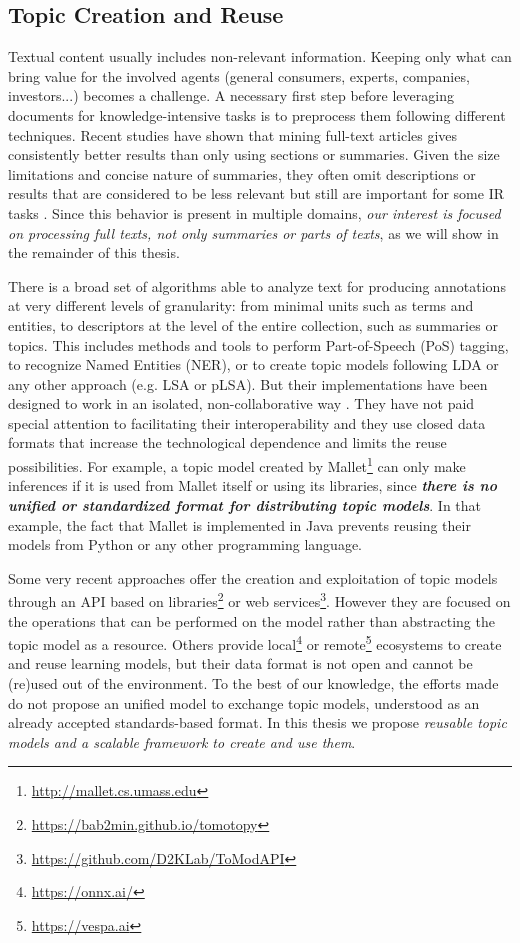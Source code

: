 \subsection{Topic Creation and Reuse}
\label{sec:topic-reuse}

Textual content usually includes non-relevant information. Keeping only what can bring value for the involved agents (general consumers, experts, companies, investors...) becomes a challenge. A necessary first step before leveraging documents for knowledge-intensive tasks is to preprocess them following different techniques. Recent studies \citep{Westergaard2017} have shown that mining full-text articles gives consistently better results than only using sections or summaries. Given the size limitations and concise nature of summaries, they often omit descriptions or results that are considered to be less relevant but still are important for some IR tasks \citep{Divoli2012}.  Since this behavior is present in multiple domains, \textit{our interest is focused on processing full texts, not only summaries or parts of texts}, as we will show in the remainder of this thesis.

There is a broad set of algorithms able to analyze text for producing annotations at very different levels of granularity: from minimal units such as terms and entities, to descriptors at the level of the entire collection, such as summaries or topics. This includes methods and tools to perform Part-of-Speech (PoS) tagging, to recognize Named Entities (NER), or to create topic models following LDA or any other approach (e.g. LSA or pLSA). But their implementations have been designed to work in an isolated, non-collaborative way \citep{Manning2014TheToolkit, Agerri2014}. They have not paid special attention to facilitating their interoperability and they use closed data formats that increase the technological dependence and limits the reuse possibilities. For example, a topic model created by Mallet\footnote{\url{http://mallet.cs.umass.edu}} can only make inferences if it is used from Mallet itself or using its libraries, since \textbf{\textit{there is no unified or standardized format for distributing topic models}}. In that example, the fact that Mallet is implemented in Java prevents reusing their models from Python or any other programming language.

Some very recent approaches offer the creation and exploitation of topic models through an API based on libraries\footnote{\url{https://bab2min.github.io/tomotopy}} or web services\footnote{\url{https://github.com/D2KLab/ToModAPI}}\citep{Lisena:NLPOSS2020}. However they are focused on the operations that can be performed on the model rather than abstracting the topic model as a resource. Others provide local\footnote{\url{https://onnx.ai/}} or remote\footnote{\url{https://vespa.ai}} ecosystems to create and reuse learning models, but their data format is not open and cannot be (re)used out of the environment. To the best of our knowledge, the efforts made do not propose an unified model to exchange topic models, understood as an already accepted standards-based format. In this thesis we propose \textit{reusable topic models and a scalable framework to create and use them}.  
 

